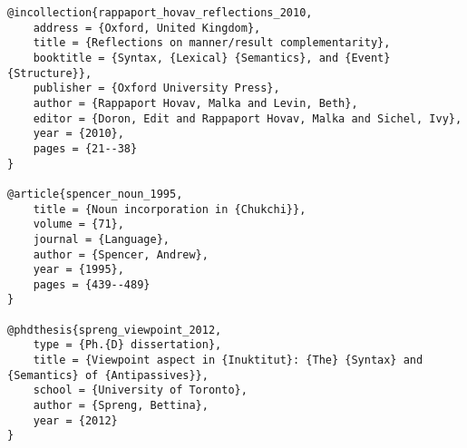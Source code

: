 \documentclass[output=paper,modfonts,nonflat]{langsci/langscibook}
\begin{document}
\begin{verbatim}
@incollection{rappaport_hovav_reflections_2010,
	address = {Oxford, United Kingdom},
	title = {Reflections on manner/result complementarity},
	booktitle = {Syntax, {Lexical} {Semantics}, and {Event} {Structure}},
	publisher = {Oxford University Press},
	author = {Rappaport Hovav, Malka and Levin, Beth},
	editor = {Doron, Edit and Rappaport Hovav, Malka and Sichel, Ivy},
	year = {2010},
	pages = {21--38}
}

@article{spencer_noun_1995,
	title = {Noun incorporation in {Chukchi}},
	volume = {71},
	journal = {Language},
	author = {Spencer, Andrew},
	year = {1995},
	pages = {439--489}
}

@phdthesis{spreng_viewpoint_2012,
	type = {Ph.{D} dissertation},
	title = {Viewpoint aspect in {Inuktitut}: {The} {Syntax} and {Semantics} of {Antipassives}},
	school = {University of Toronto},
	author = {Spreng, Bettina},
	year = {2012}
}

\end{verbatim}
\sloppy\printbibliography[heading=subbibliography,notkeyword=this]
\end{document}

